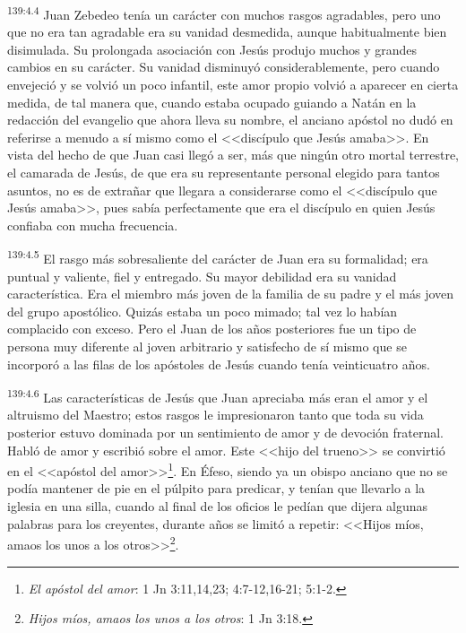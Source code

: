 \par 
\textsuperscript{139:4.4} Juan Zebedeo tenía un carácter con muchos rasgos agradables, pero uno que no era tan agradable era su vanidad desmedida, aunque habitualmente bien disimulada. Su prolongada asociación con Jesús produjo muchos y grandes cambios en su carácter. Su vanidad disminuyó considerablemente, pero cuando envejeció y se volvió un poco infantil, este amor propio volvió a aparecer en cierta medida, de tal manera que, cuando estaba ocupado guiando a Natán en la redacción del evangelio que ahora lleva su nombre, el anciano apóstol no dudó en referirse a menudo a sí mismo como el <<discípulo que Jesús amaba>>. En vista del hecho de que Juan casi llegó a ser, más que ningún otro mortal terrestre, el camarada de Jesús, de que era su representante personal elegido para tantos asuntos, no es de extrañar que llegara a considerarse como el <<discípulo que Jesús amaba>>, pues sabía perfectamente que era el discípulo en quien Jesús confiaba con mucha frecuencia.

\par 
\textsuperscript{139:4.5} El rasgo más sobresaliente del carácter de Juan era su formalidad; era puntual y valiente, fiel y entregado. Su mayor debilidad era su vanidad característica. Era el miembro más joven de la familia de su padre y el más joven del grupo apostólico. Quizás estaba un poco mimado; tal vez lo habían complacido con exceso. Pero el Juan de los años posteriores fue un tipo de persona muy diferente al joven arbitrario y satisfecho de sí mismo que se incorporó a las filas de los apóstoles de Jesús cuando tenía veinticuatro años.

\par 
\textsuperscript{139:4.6} Las características de Jesús que Juan apreciaba más eran el amor y el altruismo del Maestro; estos rasgos le impresionaron tanto que toda su vida posterior estuvo dominada por un sentimiento de amor y de devoción fraternal. Habló de amor y escribió sobre el amor. Este <<hijo del trueno>> se convirtió en el <<apóstol del amor>>\footnote{\textit{El apóstol del amor}: 1 Jn 3:11,14,23; 4:7-12,16-21; 5:1-2.}. En Éfeso, siendo ya un obispo anciano que no se podía mantener de pie en el púlpito para predicar, y tenían que llevarlo a la iglesia en una silla, cuando al final de los oficios le pedían que dijera algunas palabras para los creyentes, durante años se limitó a repetir: <<Hijos míos, amaos los unos a los otros>>\footnote{\textit{Hijos míos, amaos los unos a los otros}: 1 Jn 3:18.}.

